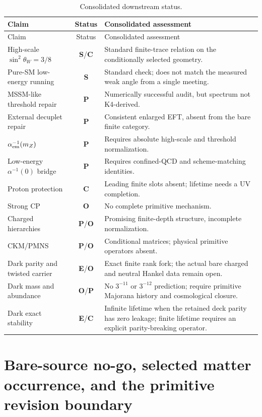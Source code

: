 \documentclass[11pt,oneside,openany]{book}
\numberwithin{equation}{chapter}
\theoremstyle{definition}
\theoremstyle{remark}
\newcommand{\statusE}{\textcolor{ExactColor}{\textbf{E}}}
\newcommand{\statusC}{\textcolor{CondColor}{\textbf{C}}}
\newcommand{\statusS}{\textcolor{StdColor}{\textbf{S}}}
\newcommand{\statusP}{\textcolor{PostColor}{\textbf{P}}}
\newcommand{\statusO}{\textcolor{OpenColor}{\textbf{O}}}
\begin{document}
\begin{longtable}{@{}p{}cp{}@{}}
\caption{Consolidated downstream status.}\label{tab:phenom-status}\\
\toprule
Claim & Status & Consolidated assessment\\
\midrule
\endfirsthead
\toprule
Claim & Status & Consolidated assessment\\
\midrule
\endhead
High-scale $\sin^2\theta_W=3/8$ & \statusS/\statusC & Standard finite-trace relation on the conditionally selected geometry.\\
Pure-SM low-energy running & \statusS & Standard check; does not match the measured weak angle from a single meeting.\\
MSSM-like threshold repair & \statusP & Numerically successful audit, but spectrum not K4-derived.\\
External decuplet repair & \statusP & Consistent enlarged EFT, absent from the bare finite category.\\
$\alpha_{\rm em}^{-1}(m_Z)$ & \statusP & Requires absolute high-scale and threshold normalization.\\
Low-energy $\alpha^{-1}(0)$ bridge & \statusP & Requires confined-QCD and scheme-matching identities.\\
Proton protection & \statusC & Leading finite slots absent; lifetime needs a UV completion.\\
Strong CP & \statusO & No complete primitive mechanism.\\
Charged hierarchies & \statusP/\statusO & Promising finite-depth structure, incomplete normalization.\\
CKM/PMNS & \statusP/\statusO & Conditional matrices; physical primitive operators absent.\\
Dark parity and twisted carrier & \statusE/\statusO & Exact finite rank fork; the actual bare charged and neutral Hankel data remain open.\\
Dark mass and abundance & \statusO/\statusP & No \(3^{-11}\) or \(3^{-12}\) prediction; require primitive Majorana history and cosmological closure.\\
Dark exact stability & \statusE/\statusC & Infinite lifetime when the retained deck parity has zero leakage; finite lifetime requires an explicit parity-breaking operator.\\
\bottomrule
\end{longtable}

\part{Bare-source no-go, selected matter occurrence, and the primitive revision boundary}
\end{document}

